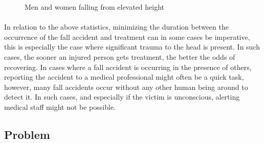 \documentclass[12pt, a4paper, onecolumn]{article}
\begin{document}
		\begin{figure}[h]
			\centering
			\qquad
			\caption{Men and women falling from elevated height}%
			\label{fig:example}%
		\end{figure}
	
			\paragraph{} In relation to the above statistics, minimizing the duration between the occurrence of the fall accident and treatment can in some cases be imperative, this is especially the case where significant trauma to the head is present. In such cases, the sooner an injured person gets treatment, the better the odds of recovering. In cases where a fall accident is occurring in the presence of others, reporting the accident to a medical professional might often be a quick task, however, many fall accidents occur without any other human being around to detect it. In such cases, and especially if the victim is unconscious, alerting medical staff might not be possible. 
		
		
		\subsection{Problem}
		
\end{document}

